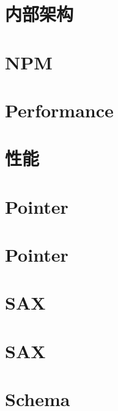 \documentclass[twoside]{book}
\newcommand{\+}{\discretionary{\mbox{\scriptsize$\hookleftarrow$}}{}{}}
\begin{document}
\chapter{内部架构}
\label{md_src_rapidjson_doc_internals_zh_cn}

\chapter{NPM}
\label{md_src_rapidjson_doc_npm}

\chapter{Performance}
\label{md_src_rapidjson_doc_performance}

\chapter{性能}
\label{md_src_rapidjson_doc_performance_zh_cn}

\chapter{Pointer}
\label{md_src_rapidjson_doc_pointer}

\chapter{Pointer}
\label{md_src_rapidjson_doc_pointer_zh_cn}

\chapter{SAX}
\label{md_src_rapidjson_doc_sax}

\chapter{SAX}
\label{md_src_rapidjson_doc_sax_zh_cn}

\chapter{Schema}
\label{md_src_rapidjson_doc_schema}

\end{document}
